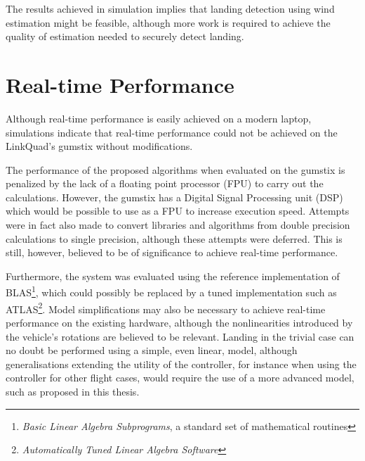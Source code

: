        The results achieved in simulation implies that landing detection
        using wind estimation might be feasible, although more work is required
        to achieve the quality of estimation needed to securely detect landing.
\pagebreak
    \section{Real-time Performance}
        Although real-time performance is easily achieved on a modern laptop,
        simulations indicate that real-time performance
        could not be achieved on the LinkQuad's gumstix without modifications.

        The performance of the proposed algorithms when evaluated on the
        gumstix is penalized by the lack of a floating point processor (FPU) to
        carry out the calculations. However, the gumstix has a
        Digital Signal Processing unit (DSP) which would be possible to
        use as a FPU to increase execution speed.
        Attempts were in fact also made to convert libraries and algorithms from
        double precision calculations to single precision, although these attempts were deferred.
        This is still, however, believed to be of significance to achieve real-time performance.

        Furthermore, the system was evaluated
        using the reference implementation of BLAS\footnote{\textit{Basic Linear Algebra Subprograms},
        a standard set of mathematical routines}, which could possibly
        be replaced by a tuned implementation such as ATLAS\footnote{\textit{Automatically Tuned Linear Algebra Software}}.
        Model simplifications may also be necessary to achieve real-time performance
        on the existing hardware, although the nonlinearities introduced by the vehicle's
        rotations are believed to be relevant.
        Landing in the trivial case can no doubt be performed using a simple, even linear, model,
        although generalisations extending the utility of the controller, for instance when
        using the controller for other flight cases, would require the use
        of a more advanced model, such as proposed in this thesis.
